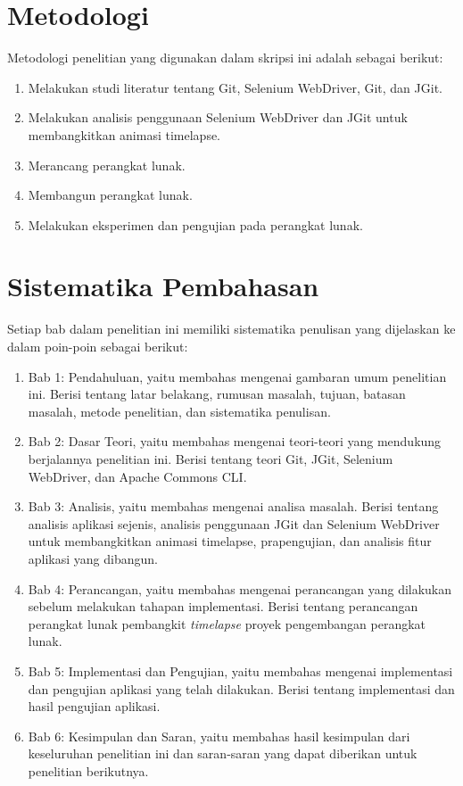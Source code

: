 \section{Metodologi}
\label{sec:metlit}
Metodologi penelitian yang digunakan dalam skripsi ini adalah sebagai berikut:
\begin{enumerate}
		\item Melakukan studi literatur tentang Git, Selenium WebDriver, Git, dan JGit.
		\item Melakukan analisis penggunaan Selenium WebDriver dan JGit untuk membangkitkan animasi timelapse.
		\item Merancang perangkat lunak.
		\item Membangun perangkat lunak.
		\item Melakukan eksperimen dan pengujian pada perangkat lunak.
	\end{enumerate}

\section{Sistematika Pembahasan}
\label{sec:sispem}
Setiap bab dalam penelitian ini memiliki sistematika penulisan yang dijelaskan ke dalam poin-poin sebagai berikut:
\begin{enumerate}
		\item Bab 1: Pendahuluan, yaitu membahas mengenai gambaran umum penelitian ini. Berisi tentang latar belakang, rumusan masalah, tujuan, batasan masalah, metode penelitian, dan sistematika penulisan.
		\item Bab 2: Dasar Teori, yaitu membahas mengenai teori-teori yang mendukung berjalannya penelitian ini. Berisi tentang teori Git, JGit, Selenium WebDriver, dan Apache Commons CLI.
		\item Bab 3: Analisis, yaitu membahas mengenai analisa masalah. Berisi tentang analisis aplikasi sejenis, analisis penggunaan JGit dan Selenium WebDriver untuk membangkitkan animasi timelapse, prapengujian, dan analisis fitur aplikasi yang dibangun.
		\item Bab 4: Perancangan, yaitu membahas mengenai perancangan yang dilakukan sebelum melakukan tahapan implementasi. Berisi tentang perancangan perangkat lunak pembangkit \textit{timelapse} proyek pengembangan perangkat lunak.
		\item Bab 5: Implementasi dan Pengujian, yaitu membahas mengenai implementasi dan pengujian aplikasi yang telah dilakukan. Berisi tentang implementasi dan hasil pengujian aplikasi.
		\item Bab 6: Kesimpulan dan Saran, yaitu membahas hasil kesimpulan dari keseluruhan penelitian ini dan saran-saran yang dapat diberikan untuk penelitian berikutnya.
	\end{enumerate}
